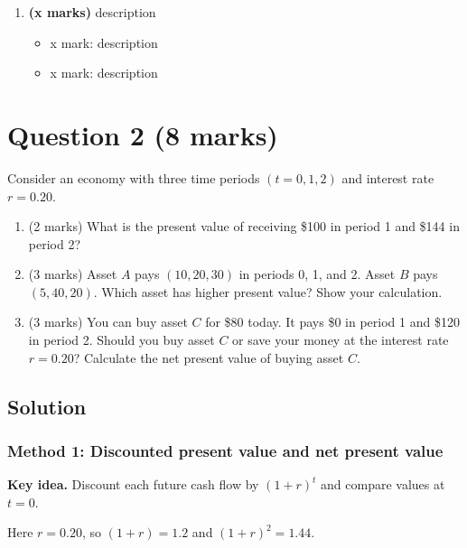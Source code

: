 \documentclass[12pt]{article}
\begin{document}
\begin{enumerate}[label=(\alph*)]
\item \textbf{(x marks)} description
\begin{itemize}
\item x mark: description
\item x mark: description
\end{itemize}
\end{enumerate}


\newpage

\section{Question 2 (8 marks)}

Consider an economy with three time periods $(t = 0, 1, 2)$ and interest rate $r = 0.20$.

\begin{enumerate}[label=(\alph*)]
\item (2 marks) What is the present value of receiving \$100 in period 1 and \$144 in period 2?
\item (3 marks) Asset $A$ pays $(10, 20, 30)$ in periods 0, 1, and 2. Asset $B$ pays $(5, 40, 20)$. Which asset has higher present value? Show your calculation.
\item (3 marks) You can buy asset $C$ for \$80 today. It pays \$0 in period 1 and \$120 in period 2. Should you buy asset $C$ or save your money at the interest rate $r = 0.20$? Calculate the net present value of buying asset $C$.
\end{enumerate}
\bigskip

\subsection{Solution}

\subsubsection{Method 1: Discounted present value and net present value}
\noindent\textbf{Key idea.} Discount each future cash flow by $(1+r)^t$ and compare values at $t=0$.

Here $r=0.20$, so $(1+r)=1.2$ and $(1+r)^2=1.44$.
\end{document}
